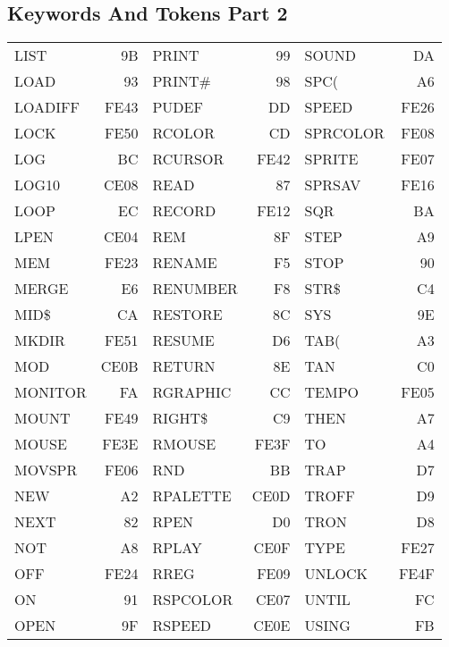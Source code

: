 \subsection{Keywords And Tokens Part 2}
{\ttfamily
\setlength{\tabcolsep}{1mm}
\begin{center}
\begin{tabular}{|p{2.2cm}r|p{2.2cm}r|p{2.2cm}r|}
\hline
LIST       &   9B &PRINT      &   99 &SOUND      &   DA \\
LOAD       &   93 &PRINT\#    &   98 &SPC(       &   A6 \\
LOADIFF    & FE43 &PUDEF      &   DD &SPEED      & FE26 \\
LOCK       & FE50 &RCOLOR     &   CD &SPRCOLOR   & FE08 \\
LOG        &   BC &RCURSOR    & FE42 &SPRITE     & FE07 \\
LOG10      & CE08 &READ       &   87 &SPRSAV     & FE16 \\
LOOP       &   EC &RECORD     & FE12 &SQR        &   BA \\
LPEN       & CE04 &REM        &   8F &STEP       &   A9 \\
MEM        & FE23 &RENAME     &   F5 &STOP       &   90 \\
MERGE      &   E6 &RENUMBER   &   F8 &STR\$      &   C4 \\
MID\$      &   CA &RESTORE    &   8C &SYS        &   9E \\
MKDIR      & FE51 &RESUME     &   D6 &TAB(       &   A3 \\
MOD        & CE0B &RETURN     &   8E &TAN        &   C0 \\
MONITOR    &   FA &RGRAPHIC   &   CC &TEMPO      & FE05 \\
MOUNT      & FE49 &RIGHT\$    &   C9 &THEN       &   A7 \\
MOUSE      & FE3E &RMOUSE     & FE3F &TO         &   A4 \\
MOVSPR     & FE06 &RND        &   BB &TRAP       &   D7 \\
NEW        &   A2 &RPALETTE   & CE0D &TROFF      &   D9 \\
NEXT       &   82 &RPEN       &   D0 &TRON       &   D8 \\
NOT        &   A8 &RPLAY      & CE0F &TYPE       & FE27 \\
OFF        & FE24 &RREG       & FE09 &UNLOCK     & FE4F \\
ON         &   91 &RSPCOLOR   & CE07 &UNTIL      &   FC \\
OPEN       &   9F &RSPEED     & CE0E &USING      &   FB \\

\end{tabular}
\end{center}}
